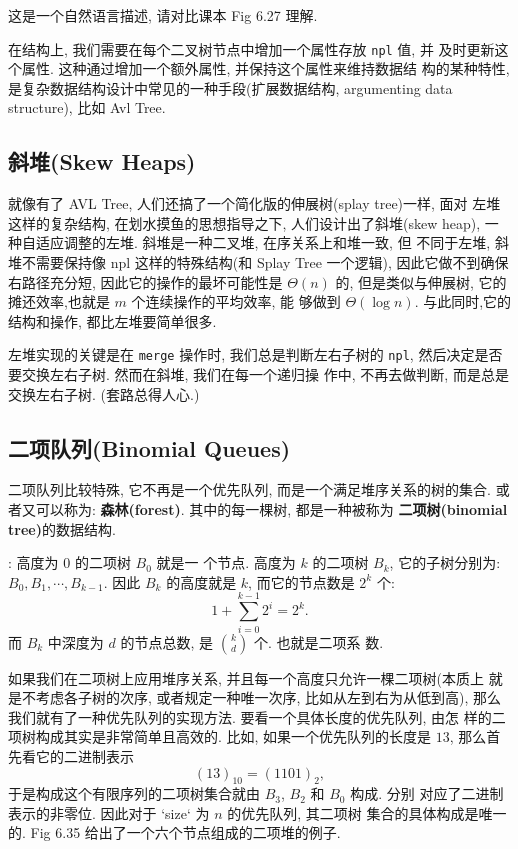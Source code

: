 \documentclass[a4paper]{ctexart}
\theoremstyle{definition}
\theoremstyle{definition}
\begin{document}
这是一个自然语言描述, 请对比课本 Fig 6.27 理解. 

在结构上, 我们需要在每个二叉树节点中增加一个属性存放 \verb|npl| 值, 并
及时更新这个属性. 这种通过增加一个额外属性, 并保持这个属性来维持数据结
构的某种特性, 是复杂数据结构设计中常见的一种手段(扩展数据结构,
argumenting data structure), 比如 Avl Tree.

\subsection{斜堆(Skew Heaps)}

就像有了 AVL Tree, 人们还搞了一个简化版的伸展树(splay tree)一样, 面对
左堆这样的复杂结构, 在划水摸鱼的思想指导之下, 人们设计出了斜堆(skew
heap), 一种自适应调整的左堆. 斜堆是一种二叉堆, 在序关系上和堆一致, 但
不同于左堆, 斜堆不需要保持像 npl 这样的特殊结构(和 Splay Tree 一个逻辑),
因此它做不到确保右路径充分短, 因此它的操作的最坏可能性是 $\Theta(n)$
的, 但是类似与伸展树, 它的摊还效率,也就是 $m$ 个连续操作的平均效率, 能
够做到 $\Theta(\log n)$. 与此同时,它的结构和操作, 都比左堆要简单很多.

左堆实现的关键是在 \verb|merge| 操作时, 我们总是判断左右子树的
\verb|npl|, 然后决定是否要交换左右子树. 然而在斜堆, 我们在每一个递归操
作中, 不再去做判断, 而是总是交换左右子树. (套路总得人心.)

\subsection{二项队列(Binomial Queues)}

二项队列比较特殊, 它不再是一个优先队列, 而是一个满足堆序关系的树的集合.
或者又可以称为: {\bf 森林(forest)}. 其中的每一棵树, 都是一种被称为{\bf
  二项树(binomial tree)}的数据结构.

: 高度为 $0$ 的二项树 $B_0$ 就是一
个节点. 高度为 $k$ 的二项树 $B_k$, 它的子树分别为: $B_0, B_1, \cdots,
B_{k - 1}$. 因此 $B_k$ 的高度就是 $k$, 而它的节点数是 $2^k$ 个:
$$ 
1 + \sum_{i = 0}^{k - 1} 2^i = 2^k.  
$$
而 $B_k$ 中深度为 $d$ 的节点总数, 是 $k \choose d$ 个. 也就是二项系
数.

如果我们在二项树上应用堆序关系, 并且每一个高度只允许一棵二项树(本质上
就是不考虑各子树的次序, 或者规定一种唯一次序, 比如从左到右为从低到高),
那么我们就有了一种优先队列的实现方法. 要看一个具体长度的优先队列, 由怎
样的二项树构成其实是非常简单且高效的. 比如, 如果一个优先队列的长度是
$13$, 那么首先看它的二进制表示
$$
(13)_{10} = (1101)_2,
$$
于是构成这个有限序列的二项树集合就由 $B_3$, $B_2$ 和 $B_0$ 构成. 分别
对应了二进制表示的非零位. 因此对于 `size` 为 $n$ 的优先队列, 其二项树
集合的具体构成是唯一的. Fig 6.35 给出了一个六个节点组成的二项堆的例子. 
\end{document}
